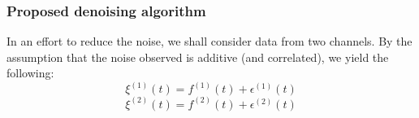 \documentclass[onecolumn, groupedaddress, 10pt]{revtex4-1}
\begin{document}
\subsubsection{Proposed denoising algorithm}
In an effort to reduce the noise, we shall consider data from two channels. By the assumption that the noise observed is additive (and correlated), we yield the following:
\begin{equation}
\xi^{(1)}(t) = f^{(1)}(t) + \epsilon^{(1)}(t)
\end{equation}
\begin{equation}
\xi^{(2)}(t) = f^{(2)}(t) + \epsilon^{(2)}(t)
\end{equation}

\end{document}
